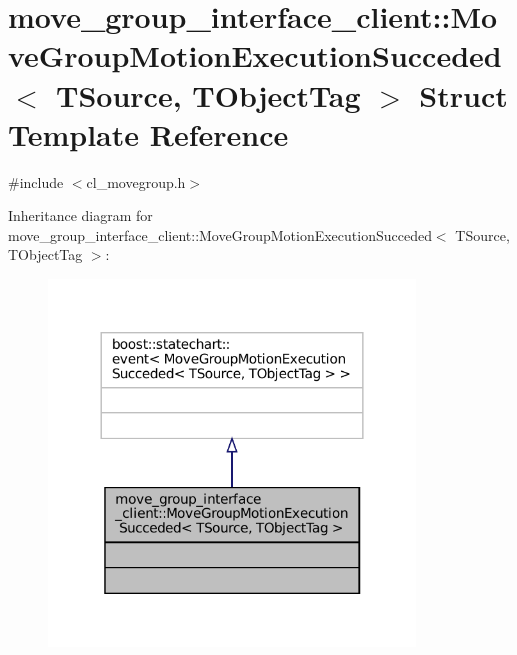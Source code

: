 \hypertarget{structmove__group__interface__client_1_1MoveGroupMotionExecutionSucceded}{}\section{move\+\_\+group\+\_\+interface\+\_\+client\+:\+:Move\+Group\+Motion\+Execution\+Succeded$<$ T\+Source, T\+Object\+Tag $>$ Struct Template Reference}
\label{structmove__group__interface__client_1_1MoveGroupMotionExecutionSucceded}


{\ttfamily \#include $<$cl\+\_\+movegroup.\+h$>$}



Inheritance diagram for move\+\_\+group\+\_\+interface\+\_\+client\+:\+:Move\+Group\+Motion\+Execution\+Succeded$<$ T\+Source, T\+Object\+Tag $>$\+:
\nopagebreak
\begin{figure}[H]
\begin{center}
\leavevmode
\includegraphics[width=276pt]{structmove__group__interface__client_1_1MoveGroupMotionExecutionSucceded__inherit__graph}
\end{center}
\end{figure}



